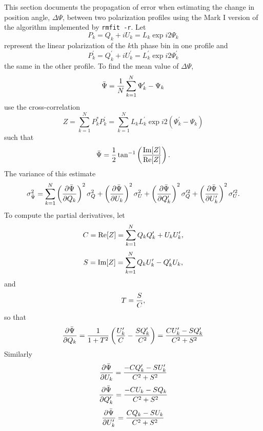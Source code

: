\documentclass[12pt]{article}
\newcommand{\real}{{\rm Re}}
\newcommand{\imag}{{\rm Im}}
\begin{document}
This section documents the propagation of error when estimating the
change in position angle, $\Delta\Psi$, between two polarization
profiles using the Mark I version of the algorithm implemented by {\tt rmfit -r}.
%
Let
\begin{equation}
P_k = Q_k + i U_k = L_k \exp i2\Psi_k
\end{equation}
represent the linear polarization of the $k$th phase bin in one profile and
\begin{equation}
P^\prime_k = Q^\prime_k + i U^\prime_k = L^\prime_k \exp i2\Psi^\prime_k
\end{equation}
the same in the other profile.  To find the mean value of $\Delta\Psi$,
\begin{equation}
\bar\Psi = {1\over N}\sum_{k=1}^N \Psi^\prime_k - \Psi_k
\end{equation}
use the cross-correlation
\begin{equation}
Z = \sum_{k=1}^N P^*_k P^\prime_k 
  = \sum_{k=1}^N L_k L^\prime_k \exp i2(\Psi^\prime_k - \Psi_k)
\end{equation}
such that
\begin{equation}
\bar\Psi
={1\over2}\tan^{-1}\left({\imag[Z]\over\real[Z]}\right).
\end{equation}
The variance of this estimate
\begin{equation}
\sigma_{\bar\Psi}^2 = \sum_{k=1}^N 
\left({\partial\bar\Psi\over\partial Q_k}\right)^2 \sigma_Q^2 +
\left({\partial\bar\Psi\over\partial U_k}\right)^2 \sigma_U^2 +
\left({\partial\bar\Psi\over\partial Q^\prime_k}\right)^2 \sigma_Q^{\prime2} +
\left({\partial\bar\Psi\over\partial U^\prime_k}\right)^2 \sigma_U^{\prime2}.
\label{eqn:var_Psi}
\end{equation}
To compute the partial derivatives, let
\begin{equation}
C = \real[Z] = \sum_{k=1}^N Q_kQ^\prime_k + U_kU^\prime_k,
\label{eqn:real_Z}
\end{equation}
\begin{equation}
S = \imag[Z] = \sum_{k=1}^N Q_kU^\prime_k - Q^\prime_kU_k,
\label{eqn:imag_Z}
\end{equation}
and
\begin{equation}
T = {S\over C},
\end{equation}
so that
\begin{equation}
{\partial\bar\Psi\over\partial Q_k} 
= {1\over1+T^2} \left( {U^\prime_k \over C} - {S Q^\prime_k\over C^2} \right)
= { C U^\prime_k - S Q^\prime_k \over C^2 + S^2 }
\end{equation}
Similarly
\begin{equation}
{\partial\bar\Psi\over\partial U_k} 
= { -C Q^\prime_k - S U^\prime_k \over C^2 + S^2 }
\end{equation}
\begin{equation}
{\partial\bar\Psi\over\partial Q^\prime_k} 
= { -C U_k - S Q_k \over C^2 + S^2 }
\end{equation}
\begin{equation}
{\partial\bar\Psi\over\partial U^\prime_k} 
= { C Q_k - S U_k \over C^2 + S^2 }
\end{equation}
\end{document}
